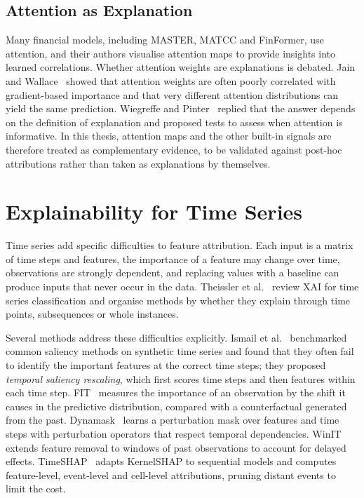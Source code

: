 \subsection{Attention as Explanation}

Many financial models, including MASTER, MATCC and FinFormer, use attention, and their authors visualise attention maps to provide insights into learned correlations. Whether attention weights are explanations is debated. Jain and Wallace~\cite{jain2019attention} showed that attention weights are often poorly correlated with gradient-based importance and that very different attention distributions can yield the same prediction. Wiegreffe and Pinter~\cite{wiegreffe2019attention} replied that the answer depends on the definition of explanation and proposed tests to assess when attention is informative. In this thesis, attention maps and the other built-in signals are therefore treated as complementary evidence, to be validated against post-hoc attributions rather than taken as explanations by themselves.

\section{Explainability for Time Series}
\label{sec:rw_xai_ts}

Time series add specific difficulties to feature attribution. Each input is a matrix of time steps and features, the importance of a feature may change over time, observations are strongly dependent, and replacing values with a baseline can produce inputs that never occur in the data. Theissler et al.~\cite{theissler2022explainable} review XAI for time series classification and organise methods by whether they explain through time points, subsequences or whole instances.

Several methods address these difficulties explicitly. Ismail et al.~\cite{ismail2020benchmarking} benchmarked common saliency methods on synthetic time series and found that they often fail to identify the important features at the correct time steps; they proposed \emph{temporal saliency rescaling}, which first scores time steps and then features within each time step. FIT~\cite{tonekaboni2020went} measures the importance of an observation by the shift it causes in the predictive distribution, compared with a counterfactual generated from the past. Dynamask~\cite{crabbe2021explaining} learns a perturbation mask over features and time steps with perturbation operators that respect temporal dependencies. WinIT~\cite{leung2023temporal} extends feature removal to windows of past observations to account for delayed effects. TimeSHAP~\cite{bento2021timeshap} adapts KernelSHAP to sequential models and computes feature-level, event-level and cell-level attributions, pruning distant events to limit the cost.

